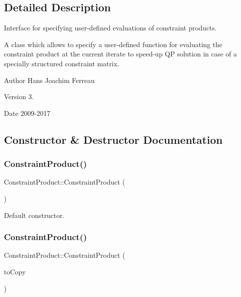 \subsection{Detailed Description}
Interface for specifying user-\/defined evaluations of constraint products. 

A class which allows to specify a user-\/defined function for evaluating the constraint product at the current iterate to speed-\/up QP solution in case of a specially structured constraint matrix.

\begin{DoxyAuthor}{Author}
Hans Joachim Ferreau 
\end{DoxyAuthor}
\begin{DoxyVersion}{Version}
3. 
\end{DoxyVersion}
\begin{DoxyDate}{Date}
2009-\/2017 
\end{DoxyDate}


\subsection{Constructor \& Destructor Documentation}
\mbox{\label{class_constraint_product_a0ebfb337c4d8f8a562263f29d40cb7d3}} 
\subsubsection{\texorpdfstring{Constraint\+Product()}{ConstraintProduct()}\hspace{0.1cm}{\footnotesize\ttfamily [1/2]}}
{\footnotesize\ttfamily Constraint\+Product\+::\+Constraint\+Product (\begin{DoxyParamCaption}{ }\end{DoxyParamCaption})\hspace{0.3cm}{\ttfamily [inline]}}

Default constructor. \mbox{\label{class_constraint_product_ac12f0cd2dfa2ad122e69435d868753cb}} 
\subsubsection{\texorpdfstring{Constraint\+Product()}{ConstraintProduct()}\hspace{0.1cm}{\footnotesize\ttfamily [2/2]}}
{\footnotesize\ttfamily Constraint\+Product\+::\+Constraint\+Product (\begin{DoxyParamCaption}\item[{const \hyperlink{class_constraint_product}{Constraint\+Product} \&}]{to\+Copy }\end{DoxyParamCaption})\hspace{0.3cm}{\ttfamily [inline]}}

